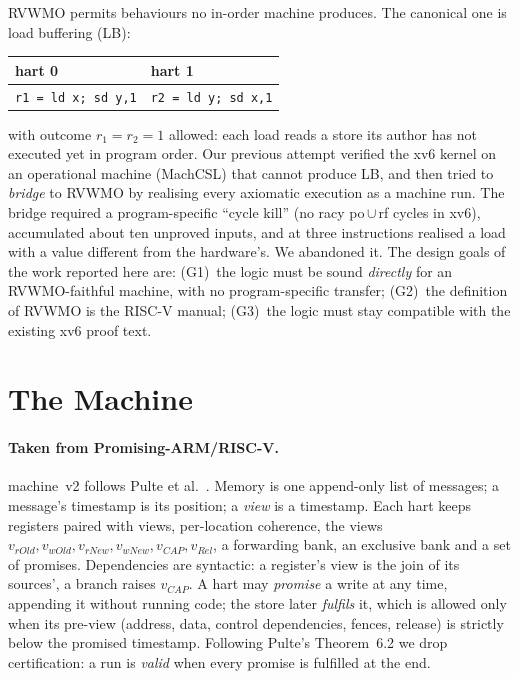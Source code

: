 \documentclass[sigplan,screen,nonacm]{acmart}
\newcommand{\rvwmo}{RVWMO\xspace}
\newcommand{\vtwo}{machine~v2\xspace}
\newcommand{\code}[1]{\texttt{#1}}
\begin{document}
\rvwmo permits behaviours no in-order machine produces. The canonical one is load buffering (LB):
\begin{center}\small
\begin{tabular}{l||l}
hart 0 & hart 1\\\midrule
\code{r1 = ld x; sd y,1} & \code{r2 = ld y; sd x,1}
\end{tabular}
\end{center}
\noindent with outcome $r_1=r_2=1$ allowed: each load reads a store its author has not executed yet in program order.
Our previous attempt verified the xv6 kernel on an operational machine (MachCSL) that cannot produce LB, and then tried
to \emph{bridge} to \rvwmo by realising every axiomatic execution as a machine run. The bridge required a
program-specific ``cycle kill'' (no racy po\,$\cup$\,rf cycles in xv6), accumulated about ten unproved inputs, and at
three instructions realised a load with a value different from the hardware's. We abandoned it. The design goals of
the work reported here are:
(G1)~the logic must be sound \emph{directly} for an \rvwmo-faithful machine, with no program-specific transfer;
(G2)~the definition of \rvwmo is the RISC-V manual;
(G3)~the logic must stay compatible with the existing xv6 proof text.

\section{The Machine}

\paragraph{Taken from Promising-ARM/RISC-V.}
\vtwo follows Pulte et al.~\cite{pulte19}. Memory is one append-only list of messages; a message's timestamp is its
position; a \emph{view} is a timestamp. Each hart keeps registers paired with views, per-location coherence, the views
$v_{rOld}, v_{wOld}, v_{rNew}, v_{wNew}, v_{CAP}, v_{Rel}$, a forwarding bank, an exclusive bank and a set of promises.
Dependencies are syntactic: a register's view is the join of its sources', a branch raises $v_{CAP}$.
A hart may \emph{promise} a write at any time, appending it without running code; the store later \emph{fulfils} it,
which is allowed only when its pre-view (address, data, control dependencies, fences, release) is strictly below the
promised timestamp. Following Pulte's Theorem~6.2 we drop certification: a run is \emph{valid} when every promise is
fulfilled at the end.
\end{document}
